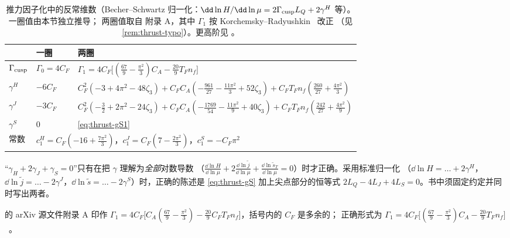 \begin{table}[htbp]
\centering
\small
\renewcommand{\arraystretch}{1.3}
\begin{tabular}{@{}lll@{}}
\toprule
 & 一圈 & 两圈 \\
\midrule
$\Gamma_{\rm cusp}$ & $\Gamma_0=4C_F$ & $\Gamma_1=4C_F\big[(\frac{67}{9}-\frac{\pi^2}{3})C_A-\frac{20}{9}T_Fn_f\big]$ \\
$\gamma^H$ & $-6C_F$ & $C_F^2(-3+4\pi^2-48\zeta_3)+C_FC_A(-\frac{961}{27}-\frac{11\pi^2}{3}+52\zeta_3)+C_FT_Fn_f(\frac{260}{27}+\frac{4\pi^2}{3})$ \\
$\gamma^J$ & $-3C_F$ & $C_F^2(-\frac32+2\pi^2-24\zeta_3)+C_FC_A(-\frac{1769}{54}-\frac{11\pi^2}{9}+40\zeta_3)+C_FT_Fn_f(\frac{242}{27}+\frac{4\pi^2}{9})$ \\
$\gamma^S$ & $0$ & \cref{eq:thrust-gS1} \\
常数 & \multicolumn{2}{l}{$c_1^H=C_F(-16+\frac{7\pi^2}{3})$，\quad $c_1^J=C_F(7-\frac{2\pi^2}{3})$，\quad $c_1^S=-C_F\pi^2$} \\
\bottomrule
\end{tabular}
\caption{推力因子化中的反常维数（Becher--Schwartz 归一化：$\dd\ln H/\dd\ln\mu=2\Gamma_{\rm cusp}L_Q+2\gamma^H$ 等）。一圈值由本节独立推导；
两圈值取自 \cite{BecherSchwartz2008} 附录 A，其中 $\Gamma_1$ 按 Korchemsky--Radyushkin~\cite{KorchemskyRadyushkin1987} 改正
（见 \cref{rem:thrust-typo}）。更高阶见 \cite{BecherSchwartz2008,MochVermaserenVogt2005}。}
\label{tab:thrust-anomdim}
\end{table}

\begin{remark}[RG 一致性关系的写法]\label{rem:thrust-RGform}
“$\gamma_H+2\gamma_J+\gamma_S=0$”只有在把 $\gamma$ 理解为\emph{全部}对数导数
（$\frac{\dd\ln H}{\dd\ln\mu}+2\frac{\dd\ln\tilde j}{\dd\ln\mu}+\frac{\dd\ln\tilde s_T}{\dd\ln\mu}=0$）时才正确。采用标准归一化
（$\dd\ln H=\dots+2\gamma^H$，$\dd\ln\tilde j=\dots-2\gamma^J$，$\dd\ln\tilde s=\dots-2\gamma^S$）时，正确的陈述是 \cref{eq:thrust-gS} 加上尖点部分的恒等式
$2L_Q-4L_J+4L_S=0$。书中须固定约定并同时写出两者。
\end{remark}

\begin{remark}[文献中的一处排印错误]\label{rem:thrust-typo}
\cite{BecherSchwartz2008} 的 arXiv 源文件附录 A 印作 $\Gamma_1=4C_F\big[C_A(\frac{67}{9}-\frac{\pi^2}{3})-\frac{20}{9}C_FT_Fn_f\big]$，括号内的 $C_F$ 是多余的；
正确形式为 $\Gamma_1=4C_F\big[(\frac{67}{9}-\frac{\pi^2}{3})C_A-\frac{20}{9}T_Fn_f\big]$~\cite{KorchemskyRadyushkin1987}。
\end{remark}

